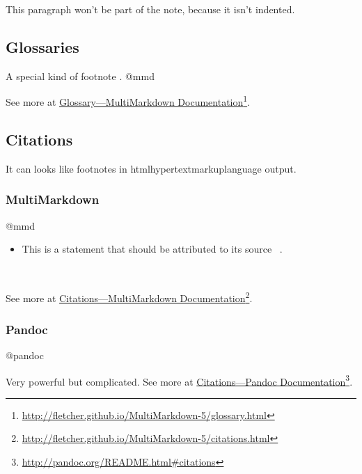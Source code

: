 This paragraph won't be part of the note, because it
isn't indented.

\subsection{Glossaries}
\label{glossaries}

A special kind of footnote . @mmd

See more at \href{http://fletcher.github.io/MultiMarkdown-5/glossary.html}{Glossary---MultiMarkdown Documentation}\footnote{\href{http://fletcher.github.io/MultiMarkdown-5/glossary.html}{http:/\slash fletcher.github.io\slash MultiMarkdown-5\slash glossary.html}}.

\subsection{Citations}
\label{citations}

It can looks like footnotes in \ac{htmlhypertextmarkuplanguage} output.

\subsubsection{MultiMarkdown}
\label{multimarkdown}

@mmd

\begin{itemize}
\item This is a statement that should be attributed to its source ~\citep[p. 23]{Doe:2006}.

\end{itemize}

~\nocite{notcited}

See more at \href{http://fletcher.github.io/MultiMarkdown-5/citations.html}{Citations---MultiMarkdown Documentation}\footnote{\href{http://fletcher.github.io/MultiMarkdown-5/citations.html}{http:/\slash fletcher.github.io\slash MultiMarkdown-5\slash citations.html}}.

\subsubsection{Pandoc}
\label{pandoc}

@pandoc

Very powerful but complicated. See more at \href{http://pandoc.org/README.html#citations}{Citations---Pandoc Documentation}\footnote{\href{http://pandoc.org/README.html\#citations}{http:/\slash pandoc.org\slash README.html\#citations}}.

